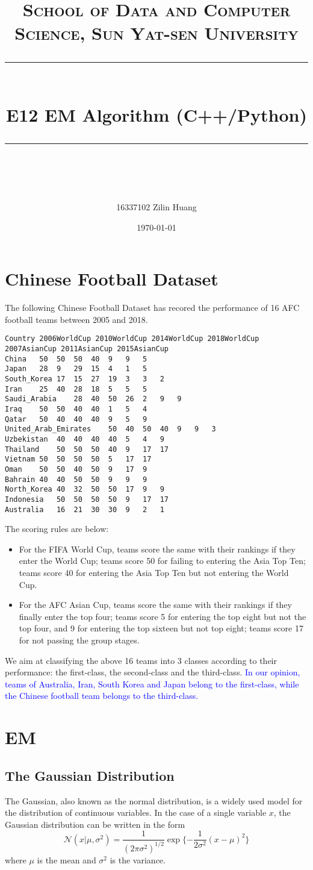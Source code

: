 ﻿\documentclass[a4paper, 11pt]{article}
\title{	
\normalfont \normalsize
\textsc{School of Data and Computer Science, Sun Yat-sen University} \\ [25pt] %
\rule{\textwidth}{0.5pt} \\[0.4cm] %
\huge  E12 EM Algorithm (C++/Python)\\ %
\rule{\textwidth}{2pt} \\[0.5cm] %
\author{16337102 Zilin Huang}
\date{\normalsize\today}
}
\numberwithin{equation}{subsection}
\begin{document}
\maketitle
\tableofcontents
\newpage
\section{Chinese Football Dataset}
The following Chinese Football Dataset has recored the performance of 16 AFC football teams between 2005 and 2018.
\begin{lstlisting}
Country	2006WorldCup 2010WorldCup 2014WorldCup 2018WorldCup 2007AsianCup 2011AsianCup 2015AsianCup
China	50	50	50	40	9	9	5
Japan	28	9	29	15	4	1	5
South_Korea	17	15	27	19	3	3	2
Iran	25	40	28	18	5	5	5
Saudi_Arabia	28	40	50	26	2	9	9
Iraq	50	50	40	40	1	5	4
Qatar	50	40	40	40	9	5	9
United_Arab_Emirates	50	40	50	40	9	9	3
Uzbekistan	40	40	40	40	5	4	9
Thailand	50	50	50	40	9	17	17
Vietnam	50	50	50	50	5	17	17
Oman	50	50	40	50	9	17	9
Bahrain	40	40	50	50	9	9	9
North_Korea	40	32	50	50	17	9	9
Indonesia	50	50	50	50	9	17	17
Australia	16	21	30	30	9	2	1
\end{lstlisting}

The scoring rules are below:
\begin{itemize}
	\item For the FIFA World Cup, teams score the same with their rankings if they enter the World Cup; teams score 50 for failing to entering the Asia Top Ten; teams score 40 for entering the Asia Top Ten but not entering the World Cup.
	\item For the AFC Asian Cup, teams score the same with their rankings if they finally enter the top four; teams score 5 for entering the top eight but not the top four, and 9 for entering the top sixteen but not top eight; teams score 17 for not passing the group stages.
\end{itemize}

We aim at classifying the above 16 teams into 3 classes according to their performance: the first-class, the second-class and the third-class. \textcolor{blue}{In our opinion, teams of Australia, Iran, South Korea and Japan belong to the first-class, while the Chinese football team belongs to the third-class.}



\section{EM}
\subsection{The Gaussian Distribution}
The Gaussian, also known as the normal distribution, is a widely used model for the distribution of continuous variables. In the case of a single variable $x$, the Gaussian distribution can be written in the form
\begin{equation}
\mathcal N(x|\mu,\sigma^2)=\frac{1}{(2\pi\sigma^2)^{1/2}}\exp\{-\frac{1}{2\sigma^2}(x-\mu)^2\}
\end{equation}
where $\mu$ is the mean and $\sigma^2$ is the variance.
\end{document}
